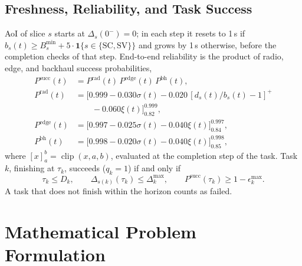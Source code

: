 \documentclass[conference]{IEEEtran}
\newcommand{\ind}[1]{\mathbf{1}\{#1\}}
\DeclareMathOperator{\clip}{clip}
\begin{document}
\subsection{Freshness, Reliability, and Task Success}
AoI of slice $s$ starts at $\Delta_s(0^-)=0$; in each step it resets to 1\,s if $b_s(t)\ge B_s^{\min}+5\cdot\ind{s\in\{\mathrm{SC},\mathrm{SV}\}}$ and grows by 1\,s otherwise, before the completion checks of that step. End-to-end reliability is the product of radio, edge, and backhaul success probabilities,
\begin{equation}
\begin{aligned}
P^{\mathrm{succ}}(t) &= P^{\mathrm{rad}}(t)\,P^{\mathrm{edge}}(t)\,P^{\mathrm{bh}}(t),\\
P^{\mathrm{rad}}(t) &= \big[0.999-0.030\sigma(t)-0.020\,[d_s(t)/b_s(t)-1]^+\\
&\qquad -0.060\xi(t)\big]_{0.82}^{0.999},\\
P^{\mathrm{edge}}(t) &= \big[0.997-0.025\sigma(t)-0.040\xi(t)\big]_{0.84}^{0.997},\\
P^{\mathrm{bh}}(t) &= \big[0.998-0.020\sigma(t)-0.040\xi(t)\big]_{0.85}^{0.998},
\end{aligned}
\label{eq:rel}
\end{equation}
where $[x]_a^b=\clip(x,a,b)$, evaluated at the completion step of the task. Task $k$, finishing at $\tau_k$, succeeds ($q_k=1$) if and only if
\begin{equation}
\tau_k\le D_k,\qquad \Delta_{s(k)}(\tau_k)\le\Delta_k^{\max},\qquad P^{\mathrm{succ}}(\tau_k)\ge 1-\epsilon_k^{\max}.
\label{eq:success}
\end{equation}
A task that does not finish within the horizon counts as failed.

\section{Mathematical Problem Formulation}\label{sec:problem}
\end{document}
